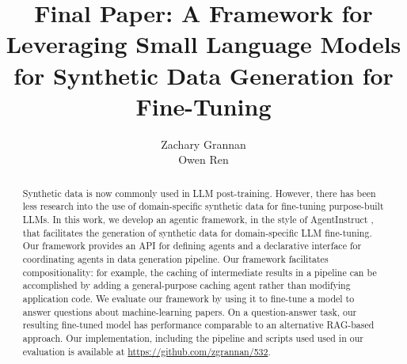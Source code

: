 \documentclass{article}
\title{Final Paper: A Framework for Leveraging Small Language Models for Synthetic Data Generation for
Fine-Tuning}
\author{%
  Zachary Grannan \\
  \And{}
  Owen Ren
}
\begin{document}
\maketitle

\begin{abstract}
Synthetic data is now commonly used in LLM post-training. However, there has
been less research into the use of domain-specific synthetic data for
fine-tuning purpose-built LLMs. In this work, we develop an agentic framework,
in the style of AgentInstruct \citep{mitra_agentinstruct_2024}, that facilitates
the generation of synthetic data for domain-specific LLM fine-tuning. Our
framework provides an API for defining agents and a declarative interface for
coordinating agents in data generation pipeline. Our framework facilitates
compositionality: for example, the caching of intermediate results in a pipeline
can be accomplished by adding a general-purpose caching agent rather than
modifying application code.  We evaluate our framework by using it to fine-tune
a model to answer questions about machine-learning papers. On a question-answer
task, our resulting fine-tuned model has performance comparable to an
alternative RAG-based approach. Our implementation, including the pipeline and scripts used
used in our evaluation is available at \url{https://github.com/zgrannan/532}.
\end{abstract}










\clearpage





\end{document}
